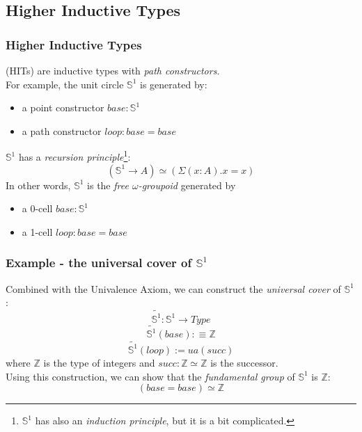 \documentclass[dvipdfmx]{beamer}
\begin{document}
\subsection{Higher Inductive Types}

\begin{frame}
  \frametitle{Higher Inductive Types}
  (HITs) are inductive types with {\it path constructors}. \\
  For example, the unit circle ${\mathbb S}^1$ is generated by:
  \begin{itemize}
      \pause
    \item a point constructor $base : {\mathbb S}^1$
      \pause
    \item a path constructor $loop : base = base$
  \end{itemize}
  \pause
  ${\mathbb S}^1$ has a {\it recursion principle}\footnote{
    ${\mathbb S}^1$ has also an {\it induction principle},
    but it is a bit complicated.}:
  \[
    \left( {\mathbb S}^1 \to A \right) \simeq
    \left( \Sigma \left( x : A \right) . x = x \right)
  \]
  In other words, ${\mathbb S}^1$ is the {\it free $\omega$-groupoid}
  generated by
  \begin{itemize}
    \item a 0-cell $base : {\mathbb S}^1$
    \item a 1-cell $loop : base = base$
  \end{itemize}
\end{frame}

\begin{frame}
  \frametitle{Example - the universal cover of ${\mathbb S}^1$}
  Combined with the Univalence Axiom,
  we can construct the {\it universal cover} of ${\mathbb S}^1$:
  \[
    \widetilde{ {\mathbb S}^1 } : {\mathbb S}^1 \to Type
  \]
  \[
    \widetilde{ {\mathbb S}^1 } \left( base \right) :\equiv {\mathbb Z}
  \]
  \[
    \widetilde{ {\mathbb S}^1 } \left( loop \right) := ua \left( succ \right)
  \]
  where ${\mathbb Z}$ is the type of integers
  and $succ : {\mathbb Z} \simeq {\mathbb Z}$ is the successor.
  \pause
  \\
  Using this construction, we can show that
  the {\it fundamental group} of ${\mathbb S}^1$ is ${\mathbb Z}$:
  \[
    \left( base = base \right) \simeq {\mathbb Z}
  \]
\end{frame}
\end{document}
